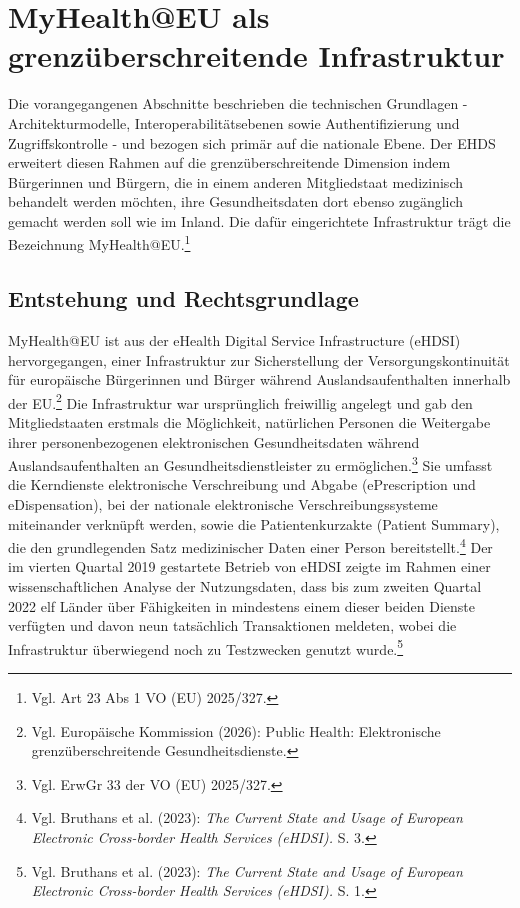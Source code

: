 \section{MyHealth@EU als grenzüberschreitende Infrastruktur}
Die vorangegangenen Abschnitte beschrieben die technischen Grundlagen - Architekturmodelle, Interoperabilitätsebenen sowie Authentifizierung und Zugriffskontrolle - und bezogen sich primär auf die nationale Ebene. Der EHDS erweitert diesen Rahmen auf die grenzüberschreitende Dimension indem Bürgerinnen und Bürgern, die in einem anderen Mitgliedstaat medizinisch behandelt werden möchten, ihre Gesundheitsdaten dort ebenso zugänglich gemacht werden soll wie im Inland. Die dafür eingerichtete Infrastruktur trägt die Bezeichnung MyHealth@EU.\footnote{Vgl. Art 23 Abs 1 VO (EU) 2025/327.}

    \subsection{Entstehung und Rechtsgrundlage}
MyHealth@EU ist aus der eHealth Digital Service Infrastructure (eHDSI) hervorgegangen, einer Infrastruktur zur Sicherstellung der Versorgungskontinuität für europäische Bürgerinnen und Bürger während Auslandsaufenthalten innerhalb der EU.\footnote{Vgl. Europäische Kommission (2026): Public Health: Elektronische grenzüberschreitende Gesundheitsdienste.} Die Infrastruktur war ursprünglich freiwillig angelegt und gab den Mitgliedstaaten erstmals die Möglichkeit, natürlichen Personen die Weitergabe ihrer personenbezogenen elektronischen Gesundheitsdaten während Auslandsaufenthalten an Gesundheitsdienstleister zu ermöglichen.\footnote{Vgl. ErwGr 33 der VO (EU) 2025/327.} Sie umfasst die Kerndienste elektronische Verschreibung und Abgabe (ePrescription und eDispensation), bei der nationale elektronische Verschreibungssysteme miteinander verknüpft werden, sowie die Patientenkurzakte (Patient Summary), die den grundlegenden Satz medizinischer Daten einer Person bereitstellt.\footnote{Vgl. Bruthans et al. (2023): \textit{The Current State and Usage of European Electronic Cross-border Health Services (eHDSI).} S. 3.} Der im vierten Quartal 2019 gestartete Betrieb von eHDSI zeigte im Rahmen einer wissenschaftlichen Analyse der Nutzungsdaten, dass bis zum zweiten Quartal 2022 elf Länder über Fähigkeiten in mindestens einem dieser beiden Dienste verfügten und davon neun tatsächlich Transaktionen meldeten, wobei die Infrastruktur überwiegend noch zu Testzwecken genutzt wurde.\footnote{Vgl. Bruthans et al. (2023): \textit{The Current State and Usage of European Electronic Cross-border Health Services (eHDSI).} S. 1.}

